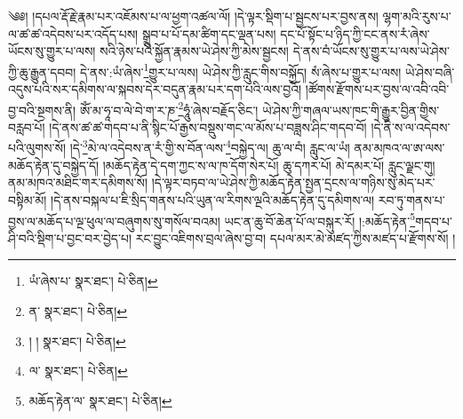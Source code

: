 \setcounter{footnote}{0} 
༄༅། །དཔལ་རྡོ་རྗེ་རྣམ་པར་འཇོམས་པ་ལ་ཕྱག་འཚལ་ལོ། །དེ་ལྟར་སྡིག་པ་སྦྱངས་པར་བྱས་ནས། ལྷག་མའི་རུས་པ་ལ་ཚ་ཚ་འདེབས་པར་འདོད་པས། སྒྲུབ་པ་པོ་དམ་ཚིག་དང་ལྡན་པས། དང་པོ་སྟོང་པ་ཉིད་ཀྱི་ངང་ནས་རཾ་ཞེས་ཡོངས་སུ་གྱུར་པ་ལས། སའི་ཉེས་པའི་སྐྱོན་རྣམས་ཡེ་ཤེས་ཀྱི་མེས་སྦྱངས། དེ་ནས་བཾ་ཡོངས་སུ་གྱུར་པ་ལས་ཡེ་ཤེས་ཀྱི་ཆུ་རྒྱུན་དབབ། དེ་ནས་:ཡཾ་ཞེས་\footnote{ཡཾ་ཞེས་པ་  སྣར་ཐང་།  པེ་ཅིན། }གྱུར་པ་ལས། ཡེ་ཤེས་ཀྱི་རླུང་གིས་བསྐྱོད། སཾ་ཞེས་པ་གྱུར་པ་ལས། ཡེ་ཤེས་བཞི་འདུས་པའི་སར་དམིགས་ལ་སྐབས་དེར་བདུན་རྣམ་པར་དག་པའི་ལས་བྱའོ། །ཚོགས་རྫོགས་པར་བྱས་ལ་འབི་འབི་བྱ་བའི་སྔགས་ནི། ཨོཾ་མ་ཧཱ་བ་ལེ་བེ་ག་ར་ཎ་\footnote{ན་  སྣར་ཐང་།  པེ་ཅིན། }ཧཱུཾ་ཞེས་བརྗོད་ཅིང་། ཡེ་ཤེས་ཀྱི་གཞལ་ཡས་ཁང་གི་རྒྱུར་བྱིན་གྱིས་བརླབ་པོ། །དེ་ནས་ཚ་ཚ་གདབ་པ་ནི་སྙིང་པོ་རྒྱས་བསྡུས་གང་ལ་མོས་པ་བཟླས་ཤིང་གདབ་བོ། །དེ་ནི་ས་ལ་འདེབས་པའི་ལུགས་སོ། །དེ་\footnote{། །  སྣར་ཐང་།  པེ་ཅིན། }མེ་ལ་འདེབས་ན་རཾ་གྱི་ས་བོན་ལས་\footnote{ལ་  སྣར་ཐང་།  པེ་ཅིན། }བསྐྱེད་ལ། ཆུ་ལ་བཾ། རླུང་ལ་ཡཾ། ནམ་མཁའ་ལ་ཨ་ལས་མཆོད་རྟེན་དུ་བསྐྱེད་དོ། །མཆོད་རྟེན་དེ་དག་ཀྱང་ས་ལ་ཁ་དོག་སེར་པོ། ཆུ་དཀར་པོ། མེ་དམར་པོ། རླུང་ལྗང་གུ། ནམ་མཁའ་མཐིང་གར་དམིགས་སོ། །དེ་ལྟར་བཏབ་ལ་ཡེ་ཤེས་ཀྱི་མཆོད་རྟེན་སྤྱན་དྲངས་ལ་གཉིས་སུ་མེད་པར་བསྟིམ་མོ། །དེ་ནས་བསྐལ་པ་ཇི་སྲིད་གནས་པའི་ཡུན་ལ་རིགས་ལྔའི་མཆོད་རྟེན་དུ་དམིགས་ལ། རབ་ཏུ་གནས་པ་བྱས་ལ་མཆོད་པ་ལྔ་ཕུལ་ལ་བཞུགས་སུ་གསོལ་བའམ། ཡང་ན་ཆུ་བོ་ཆེན་པོ་ལ་བསྐུར་རོ། །:མཆོད་རྟེན་\footnote{མཆོད་རྟེན་ལ་  སྣར་ཐང་།  པེ་ཅིན། }གདབ་པ་ཤི་བའི་སྡིག་པ་བྱང་བར་བྱེད་པ། རང་བྱུང་འཇིགས་བྲལ་ཞེས་བྱ་བ། དཔལ་མར་མེ་མཛད་ཀྱིས་མཛད་པ་རྫོགས་སོ། ། 